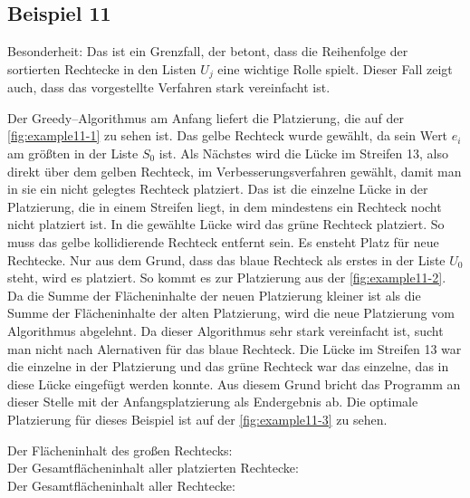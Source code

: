 \subsection{Beispiel 11}\label{ex:11}
Besonderheit: Das ist ein Grenzfall, der betont, dass die Reihenfolge der sortierten Rechtecke in den Listen $U_j$ eine wichtige Rolle spielt.
Dieser Fall zeigt auch, dass das vorgestellte Verfahren stark vereinfacht ist.
\vspace{.4cm}

Der Greedy--Algorithmus am Anfang liefert die Platzierung, die auf der \cref{fig:example11-1}
zu sehen ist. Das gelbe Rechteck wurde gewählt, da sein Wert $e_i$ am größten in der Liste 
$S_0$ ist. Als Nächstes wird die Lücke im Streifen 13, also direkt über dem gelben Rechteck,
im Verbesserungsverfahren gewählt, damit man in sie ein nicht gelegtes Rechteck platziert.
Das ist die einzelne Lücke in der Platzierung, die in einem Streifen liegt, in dem
mindestens ein Rechteck nocht nicht platziert ist.
In die gewählte Lücke wird das grüne Rechteck platziert.
So muss das gelbe kollidierende Rechteck entfernt sein. 
Es ensteht Platz für neue Rechtecke.
Nur aus dem Grund, dass das blaue Rechteck als erstes in der Liste $U_0$ steht, 
wird es platziert. So kommt es zur Platzierung aus der \cref{fig:example11-2}.
Da die Summe der Flächeninhalte der neuen Platzierung kleiner ist als die Summe 
der Flächeninhalte der alten Platzierung, wird die neue Platzierung vom Algorithmus abgelehnt.
Da dieser Algorithmus sehr stark vereinfacht ist, sucht man nicht nach Alernativen für
das blaue Rechteck. Die Lücke im Streifen 13 war die einzelne in der Platzierung und das grüne Rechteck
war das einzelne, das in diese Lücke eingefügt werden konnte. 
Aus diesem Grund bricht das Programm an dieser Stelle mit der Anfangsplatzierung als Endergebnis ab.
Die optimale Platzierung für dieses Beispiel ist auf der \cref{fig:example11-3} zu sehen.
\newpage

\noindent Der Flächeninhalt des großen Rechtecks: \\
Der Gesamtflächeninhalt aller platzierten Rechtecke: \\
Der Gesamtflächeninhalt aller Rechtecke: 


